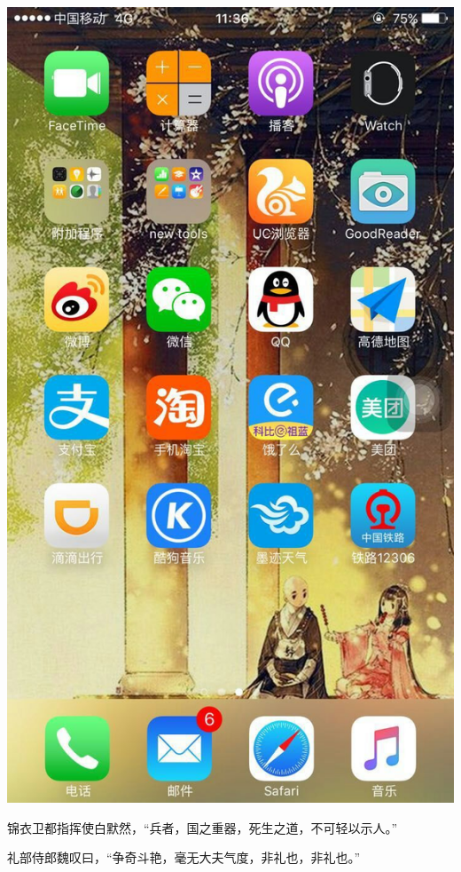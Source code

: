 \documentclass[12pt, a4paper]{book}
\begin{document}
\begin{CJK}{UTF8}{gbsn}
    \begin{center}
    \includegraphics[height=0.3\textheight]{./figure/desktop-6.jpg}
    \end{center}

    锦衣卫都指挥使白默然，“兵者，国之重器，死生之道，不可轻以示人。”

    礼部侍郎魏叹曰，“争奇斗艳，毫无大夫气度，非礼也，非礼也。”

    \appendix

    

\end{CJK}
\end{document}
